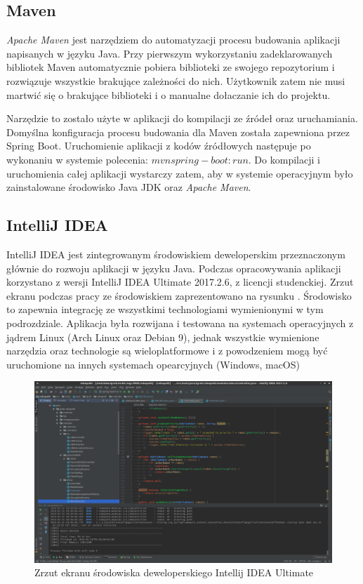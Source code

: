 \subsection{Maven}
{\it Apache Maven} jest narzędziem do automatyzacji procesu budowania aplikacji napisanych w języku Java.
Przy pierwszym wykorzystaniu zadeklarowanych bibliotek Maven automatycznie pobiera biblioteki ze swojego repozytorium i rozwiązuje wszystkie brakujące zależności do nich. Użytkownik zatem nie musi martwić się o brakujące biblioteki i o manualne dołaczanie ich do projektu.

Narzędzie to zostało użyte w aplikacji do kompilacji ze źródeł oraz uruchamiania. Domyślna konfiguracja procesu budowania dla Maven została zapewniona przez Spring Boot. Uruchomienie aplikacji z kodów źródłowych następuje po wykonaniu w systemie polecenia: $mvn spring-boot:run$.
Do kompilacji i uruchomienia całej aplikacji wystarczy zatem, aby w systemie operacyjnym było zainstalowane środowisko Java JDK oraz {\it Apache Maven}.

\subsection{IntelliJ IDEA}
IntelliJ IDEA jest zintegrowanym środowiskiem deweloperskim przeznaczonym głównie do rozwoju aplikacji w języku Java.
Podczas opracowywania aplikacji korzystano z wersji IntelliJ IDEA Ultimate 2017.2.6, z licencji studenckiej. Zrzut ekranu podczas pracy ze środowiskiem zaprezentowano na rysunku \label{fig:app-tech-intellij}.
Środowisko to zapewnia integrację ze wszystkimi technologiami wymienionymi w tym podrozdziale.
Aplikacja była rozwijana i testowana na systemach operacyjnych z jądrem Linux (Arch Linux oraz Debian 9), jednak wszystkie wymienione narzędzia oraz technologie są wieloplatformowe i z powodzeniem mogą być uruchomione na innych systemach opearcyjnych (Windows, macOS)

\begin{figure}
	\centering
	\includegraphics[width=0.9\columnwidth]{img/robopath/intellij}
	\caption{Zrzut ekranu środowiska deweloperskiego Intellij IDEA Ultimate}
	\label{fig:app-tech-intellij}
\end{figure}


